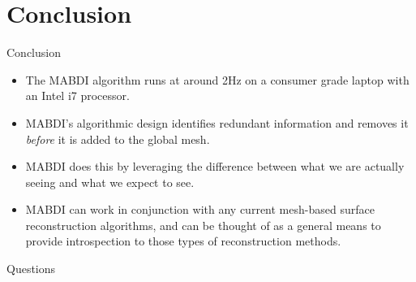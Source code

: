 \section{Conclusion}

\begin{frame}{Conclusion} %
  \begin{itemize}[<+->]
    \item The MABDI algorithm runs at around 2Hz on a consumer grade laptop with
    an Intel i7 processor.
    \item MABDI's algorithmic design identifies redundant information and removes it
    \emph{before} it is added to the global mesh.
    \item MABDI does this by leveraging the difference between what we are
    actually seeing and what we expect to see.
    \item MABDI can work in conjunction with any current mesh-based surface
    reconstruction algorithms, and can be thought of as a general means to
    provide introspection to those types of reconstruction methods.
  \end{itemize}


\end{frame}

\begin{frame}[plain] %
  \begin{center}
    {\LARGE Questions}
  \end{center}
\end{frame}
